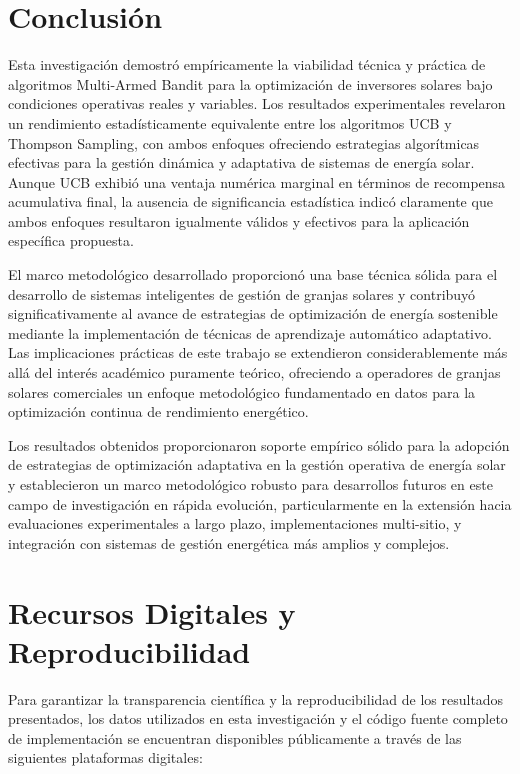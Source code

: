 \documentclass[12pt,a4paper]{article}
\begin{document}
\section{Conclusión}

\justify
Esta investigación demostró empíricamente la viabilidad técnica y práctica de algoritmos Multi-Armed Bandit para la optimización de inversores solares bajo condiciones operativas reales y variables. Los resultados experimentales revelaron un rendimiento estadísticamente equivalente entre los algoritmos UCB y Thompson Sampling, con ambos enfoques ofreciendo estrategias algorítmicas efectivas para la gestión dinámica y adaptativa de sistemas de energía solar. Aunque UCB exhibió una ventaja numérica marginal en términos de recompensa acumulativa final, la ausencia de significancia estadística indicó claramente que ambos enfoques resultaron igualmente válidos y efectivos para la aplicación específica propuesta.

El marco metodológico desarrollado proporcionó una base técnica sólida para el desarrollo de sistemas inteligentes de gestión de granjas solares y contribuyó significativamente al avance de estrategias de optimización de energía sostenible mediante la implementación de técnicas de aprendizaje automático adaptativo. Las implicaciones prácticas de este trabajo se extendieron considerablemente más allá del interés académico puramente teórico, ofreciendo a operadores de granjas solares comerciales un enfoque metodológico fundamentado en datos para la optimización continua de rendimiento energético.

Los resultados obtenidos proporcionaron soporte empírico sólido para la adopción de estrategias de optimización adaptativa en la gestión operativa de energía solar y establecieron un marco metodológico robusto para desarrollos futuros en este campo de investigación en rápida evolución, particularmente en la extensión hacia evaluaciones experimentales a largo plazo, implementaciones multi-sitio, y integración con sistemas de gestión energética más amplios y complejos.

\section{Recursos Digitales y Reproducibilidad}

\justify
Para garantizar la transparencia científica y la reproducibilidad de los resultados presentados, los datos utilizados en esta investigación y el código fuente completo de implementación se encuentran disponibles públicamente a través de las siguientes plataformas digitales:
\end{document}
